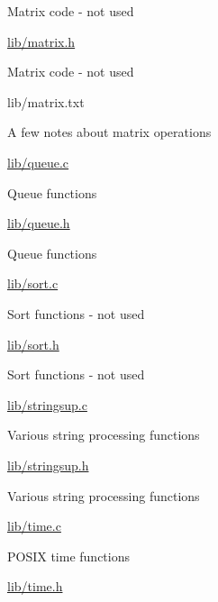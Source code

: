 \begin{DoxyPre}
\begin{DoxyItemize}
\begin{DoxyItemize}
\begin{DoxyItemize}
\item Matrix code - not used
\end{DoxyItemize}
\item \hyperlink{matrix_8h}{lib/matrix.h}
\begin{DoxyItemize}
\item Matrix code - not used
\end{DoxyItemize}
\item lib/matrix.txt
\begin{DoxyItemize}
\item A few notes about matrix operations
\end{DoxyItemize}
\item \hyperlink{queue_8c}{lib/queue.c}
\begin{DoxyItemize}
\item Queue functions
\end{DoxyItemize}
\item \hyperlink{queue_8h}{lib/queue.h}
\begin{DoxyItemize}
\item Queue functions
\end{DoxyItemize}
\item \hyperlink{sort_8c}{lib/sort.c}
\begin{DoxyItemize}
\item Sort functions - not used
\end{DoxyItemize}
\item \hyperlink{sort_8h}{lib/sort.h}
\begin{DoxyItemize}
\item Sort functions - not used
\end{DoxyItemize}
\item \hyperlink{stringsup_8c}{lib/stringsup.c}
\begin{DoxyItemize}
\item Various string processing functions
\end{DoxyItemize}
\item \hyperlink{stringsup_8h}{lib/stringsup.h}
\begin{DoxyItemize}
\item Various string processing functions
\end{DoxyItemize}
\item \hyperlink{time_8c}{lib/time.c}
\begin{DoxyItemize}
\item POSIX time functions
\end{DoxyItemize}
\item \hyperlink{time_8h}{lib/time.h}

\end{DoxyItemize}
\end{DoxyItemize}
\end{DoxyPre}
